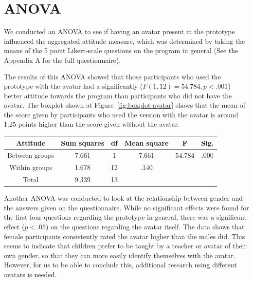 \documentclass[a4paper]{article}
\begin{document}
\section{ANOVA}

We conducted an ANOVA to see if having an avatar present in the prototype influenced the aggregated attitude measure, which was  determined by taking the means of the 5 point Likert-scale questions on the program in general (See the Appendix A for the full questionnaire).

The results of this ANOVA showed that those participants who used the prototype with the avatar had a significantly ($F(1,12) =  54.784, p < .001$) better attitude towards the program than participants who did not have the avatar. The boxplot shown at Figure~\ref{fig:boxplot-avatar} shows that the mean of the score given by participants who used the version with the avatar is around 1.25 points higher than the score given without the avatar.\newline

\begin{center}
  \begin{tabular}{| c | c | c | c | c | c |}
    \hline
    Attitude & Sum squares & df & Mean square & F & Sig. \\ \hline
    
    Between groups & 7.661 & 1 & 7.661 & 54.784 & .000 \\ \hline

    Within groups & 1.678 & 12 & .140 & & \\ \hline

    Total & 9.339 & 13 & & & \\ \hline
  \end{tabular}
\end{center}

Another ANOVA was conducted to look at the relationship between gender and the answers given on the questionnaire. While no significant effects were found for the first four questions regarding the prototype in general, there was a significant effect ($p < .05$) on the questions regarding the avatar itself. The data shows that female participants consistently rated the avatar higher than the males did. This seems to indicate that children prefer to be taught by a teacher or avatar of their own gender, so that they can more easily identify themselves with the avatar. However, for us to be able to conclude this, additional research using different avatars is needed.
\end{document}

